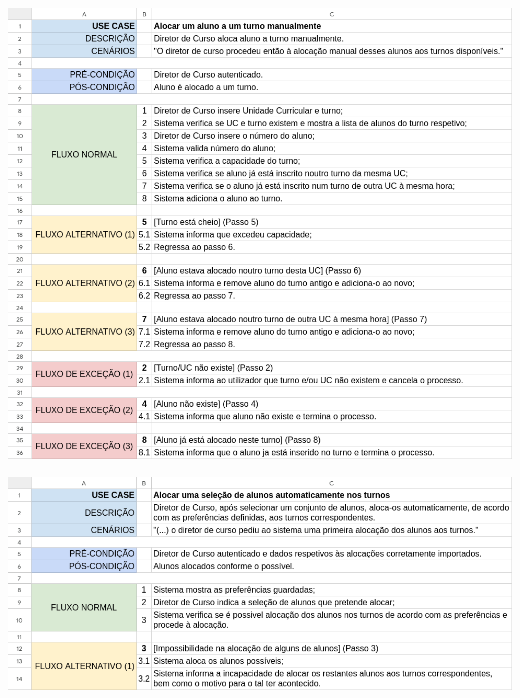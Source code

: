 \documentclass[a4paper,12pt]{scrreprt}
\begin{document}
\begin{minipage}{\textwidth}
    \centering
    \includegraphics[width=1\textwidth]{images/use-cases/descriptions/30-Alocar um aluno a um turno manualmente.png}
    \label{fig:3-30-alocar_um_aluno_a_um_turno_manualmente}
\end{minipage}

\begin{minipage}{\textwidth}
    \centering
    \includegraphics[width=1\textwidth]{images/use-cases/descriptions/31-Alocar uma seleção de alunos automaticamente nos turnos.png}
    \label{fig:3-31-alocar_uma_selecao_de_alunos_automaticamente_nos_turnos}
\end{minipage}
\end{document}
